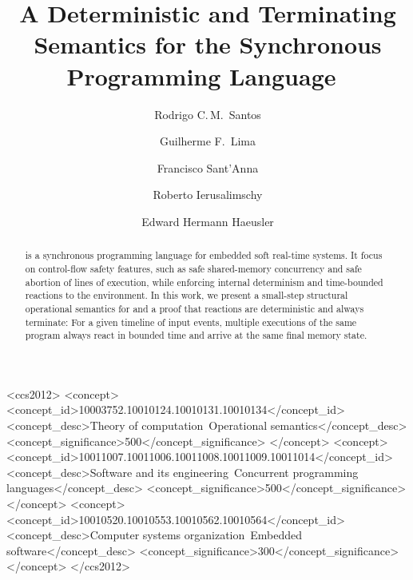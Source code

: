 \documentclass[sigplan, anonymous, review]{acmart}
\begin{document}
\title[A Deterministic and Terminating Semantics for \CEU]
{A Deterministic and Terminating Semantics
  for the Synchronous Programming Language~\CEU}

\author[R.\,C.\,M.~Santos]{Rodrigo C.\,M.~Santos}
%
\author[G.\,F.~Lima]{Guilherme F.~Lima}
%
\author[F.~Sant'Anna]{Francisco Sant'Anna}
%
\author[R.~Ierusalimschy]{Roberto Ierusalimschy}
%
\author[E.\,H.~Haeusler]{Edward Hermann Haeusler}

\begin{abstract}
\CEU is a synchronous programming language for embedded soft real-time systems.
%
It focus on control-flow safety features, such as safe shared-memory
concurrency and safe abortion of lines of execution, while enforcing internal
determinism and time-bounded reactions to the environment.
%
In this work, we present a small-step structural operational semantics for
\CEU and a proof that reactions are deterministic and always terminate:
%
For a given timeline of input events, multiple executions of the same program
always react in bounded time and arrive at the same final memory state.
%
\end{abstract}


\begin{CCSXML}
<ccs2012>
 <concept>
  <concept_id>10003752.10010124.10010131.10010134</concept_id>
  <concept_desc>Theory of computation~Operational semantics</concept_desc>
  <concept_significance>500</concept_significance>
 </concept>
 <concept>
  <concept_id>10011007.10011006.10011008.10011009.10011014</concept_id>
  <concept_desc>Software and its
                engineering~Concurrent programming languages</concept_desc>
  <concept_significance>500</concept_significance>
 </concept>
 <concept>
  <concept_id>10010520.10010553.10010562.10010564</concept_id>
  <concept_desc>Computer systems
                organization~Embedded software</concept_desc>
  <concept_significance>300</concept_significance>
 </concept>
</ccs2012>
\end{CCSXML}

\maketitle










\appendix
%
\end{document}
